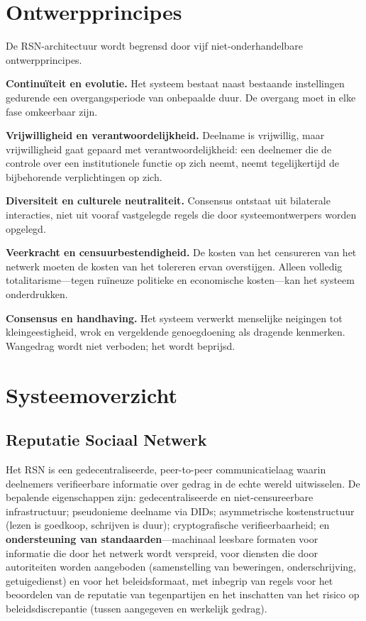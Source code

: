 \documentclass[11pt,a4paper,twocolumn]{article}
\begin{document}
\section{Ontwerpprincipes}

De RSN-architectuur wordt begrensd door vijf niet-onderhandelbare ontwerpprincipes.

\textbf{Continuïteit en evolutie.} Het systeem bestaat naast bestaande instellingen gedurende een overgangsperiode van onbepaalde duur. De overgang moet in elke fase omkeerbaar zijn.

\textbf{Vrijwilligheid en verantwoordelijkheid.} Deelname is vrijwillig, maar vrijwilligheid gaat gepaard met verantwoordelijkheid: een deelnemer die de controle over een institutionele functie op zich neemt, neemt tegelijkertijd de bijbehorende verplichtingen op zich.

\textbf{Diversiteit en culturele neutraliteit.} Consensus ontstaat uit bilaterale interacties, niet uit vooraf vastgelegde regels die door systeemontwerpers worden opgelegd.

\textbf{Veerkracht en censuurbestendigheid.} De kosten van het censureren van het netwerk moeten de kosten van het tolereren ervan overstijgen. Alleen volledig totalitarisme---tegen ruïneuze politieke en economische kosten---kan het systeem onderdrukken.

\textbf{Consensus en handhaving.} Het systeem verwerkt menselijke neigingen tot kleingeestigheid, wrok en vergeldende genoegdoening als dragende kenmerken. Wangedrag wordt niet verboden; het wordt beprijsd.

\section{Systeemoverzicht}

\subsection{Reputatie Sociaal Netwerk}

Het RSN is een gedecentraliseerde, peer-to-peer communicatielaag waarin deelnemers verifieerbare informatie over gedrag in de echte wereld uitwisselen. De bepalende eigenschappen zijn: gedecentraliseerde en niet-censureerbare infrastructuur; pseudonieme deelname via DIDs; asymmetrische kostenstructuur (lezen is goedkoop, schrijven is duur); cryptografische verifieerbaarheid; en \textbf{ondersteuning van standaarden}---machinaal leesbare formaten voor informatie die door het netwerk wordt verspreid, voor diensten die door autoriteiten worden aangeboden (samenstelling van beweringen, onderschrijving, getuigedienst) en voor het beleidsformaat, met inbegrip van regels voor het beoordelen van de reputatie van tegenpartijen en het inschatten van het risico op beleidsdiscrepantie (tussen aangegeven en werkelijk gedrag).
\end{document}
